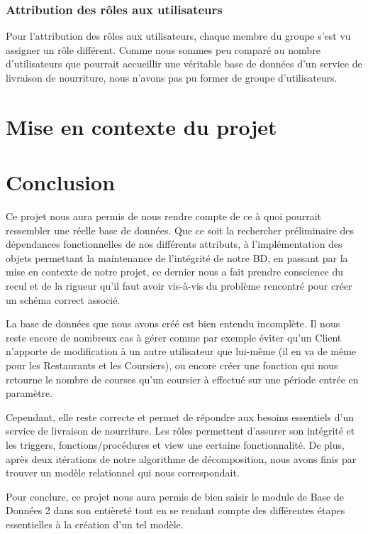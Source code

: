 \documentclass[french]{article}
\begin{document}
            \subsubsection*{Attribution des rôles aux utilisateurs}
                Pour l'attribution des rôles aux utilisateurs, chaque membre du groupe s'est vu assigner un rôle différent. Comme nous sommes peu comparé au nombre d'utilisateurs que pourrait accueillir une véritable base de données d'un service de livraison de nourriture, nous n'avons pas pu former de groupe d'utilisateurs.

    \section{Mise en contexte du projet}

    \section{Conclusion}
        Ce projet nous aura permis de nous rendre compte de ce à quoi pourrait ressembler une réelle base de données. Que ce soit la rechercher préliminaire des dépendances fonctionnelles de nos différents attributs, à l'implémentation des objets permettant la maintenance de l'intégrité de notre BD, en passant par la mise en contexte de notre projet, ce dernier nous a fait prendre conscience du recul et de la rigueur qu'il faut avoir vis-à-vis du problème rencontré pour créer un schéma correct associé.\smallskip
        
        \noindent La base de données que nous avons créé est bien entendu incomplète. Il nous reste encore de nombreux cas à gérer comme par exemple éviter qu'un Client n'apporte de modification à un autre utilisateur que lui-même (il en va de même pour les Restaurants et les Coursiers), ou encore créer une fonction qui nous retourne le nombre de courses qu'un coursier à effectué sur une période entrée en paramètre.\smallskip
  
        \noindent Cependant, elle reste correcte et permet de répondre aux besoins essentiels d'un service de livraison de nourriture. Les rôles permettent d'assurer son intégrité et les triggers, fonctions/procédures et view une certaine fonctionnalité. De plus, après deux itérations de notre algorithme de décomposition, nous avons finis par trouver un modèle relationnel qui nous correspondait.\smallskip

        \noindent Pour conclure, ce projet nous aura permis de bien saisir le module de Base de Données 2 dans son entièreté tout en se rendant compte des différentes étapes essentielles à la création d'un tel modèle.
\end{document}
